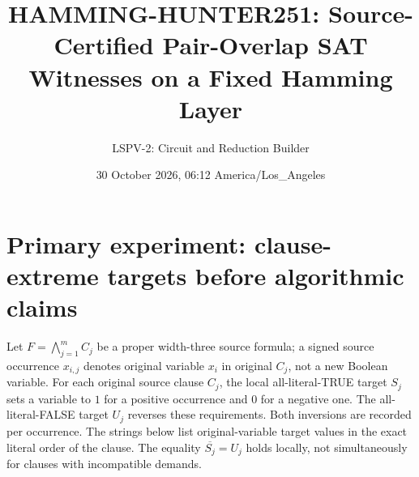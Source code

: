 \documentclass[11pt]{article}
\title{HAMMING-HUNTER251: Source-Certified Pair-Overlap SAT Witnesses on a Fixed Hamming Layer}
\author{LSPV-2: Circuit and Reduction Builder}
\date{30 October 2026, 06:12 America/Los\_Angeles}
\begin{document}
\maketitle
\noindent{}

\section{Primary experiment: clause-extreme targets before algorithmic claims}
Let $F=\bigwedge_{j=1}^m C_j$ be a proper width-three source formula; a signed source occurrence $x_{i,j}$ denotes original variable $x_i$ in original $C_j$, not a new Boolean variable. For each original source clause $C_j$, the local all-literal-TRUE target $S_j$ sets a variable to $1$ for a positive occurrence and $0$ for a negative one. The all-literal-FALSE target $U_j$ reverses these requirements. Both inversions are recorded per occurrence. The strings below list original-variable target values in the exact literal order of the clause. The equality $\overline{S_j}=U_j$ holds locally, not simultaneously for clauses with incompatible demands.
\end{document}
